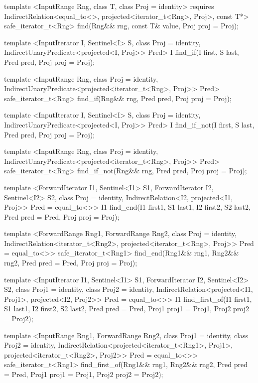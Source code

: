 \begin{codeblock}
{{{{  template <InputRange Rng, class T, class Proj = identity>
    requires IndirectRelation<equal_to<>, projected<iterator_t<Rng>, Proj>, const T*>
    safe_iterator_t<Rng>
      find(Rng&& rng, const T& value, Proj proj = Proj{});

  template <InputIterator I, Sentinel<I> S, class Proj = identity,
      IndirectUnaryPredicate<projected<I, Proj>> Pred>
    I find_if(I first, S last, Pred pred, Proj proj = Proj{});

  template <InputRange Rng, class Proj = identity,
      IndirectUnaryPredicate<projected<iterator_t<Rng>, Proj>> Pred>
    safe_iterator_t<Rng>
      find_if(Rng&& rng, Pred pred, Proj proj = Proj{});

  template <InputIterator I, Sentinel<I> S, class Proj = identity,
      IndirectUnaryPredicate<projected<I, Proj>> Pred>
    I find_if_not(I first, S last, Pred pred, Proj proj = Proj{});

  template <InputRange Rng, class Proj = identity,
      IndirectUnaryPredicate<projected<iterator_t<Rng>, Proj>> Pred>
    safe_iterator_t<Rng>
      find_if_not(Rng&& rng, Pred pred, Proj proj = Proj{});

  template <ForwardIterator I1, Sentinel<I1> S1, ForwardIterator I2,
      Sentinel<I2> S2, class Proj = identity,
      IndirectRelation<I2, projected<I1, Proj>> Pred = equal_to<>>
    I1
      find_end(I1 first1, S1 last1, I2 first2, S2 last2,
               Pred pred = Pred{}, Proj proj = Proj{});

  template <ForwardRange Rng1, ForwardRange Rng2, class Proj = identity,
      IndirectRelation<iterator_t<Rng2>,
        projected<iterator_t<Rng>, Proj>> Pred = equal_to<>>
    safe_iterator_t<Rng1>
      find_end(Rng1&& rng1, Rng2&& rng2, Pred pred = Pred{}, Proj proj = Proj{});

  template <InputIterator I1, Sentinel<I1> S1, ForwardIterator I2, Sentinel<I2> S2,
      class Proj1 = identity, class Proj2 = identity,
      IndirectRelation<projected<I1, Proj1>, projected<I2, Proj2>> Pred = equal_to<>>
    I1
      find_first_of(I1 first1, S1 last1, I2 first2, S2 last2,
                    Pred pred = Pred{},
                    Proj1 proj1 = Proj1{}, Proj2 proj2 = Proj2{});

  template <InputRange Rng1, ForwardRange Rng2, class Proj1 = identity,
      class Proj2 = identity,
      IndirectRelation<projected<iterator_t<Rng1>, Proj1>,
        projected<iterator_t<Rng2>, Proj2>> Pred = equal_to<>>
    safe_iterator_t<Rng1>
      find_first_of(Rng1&& rng1, Rng2&& rng2,
                    Pred pred = Pred{},
                    Proj1 proj1 = Proj1{}, Proj2 proj2 = Proj2{});

}}}}
\end{codeblock}
